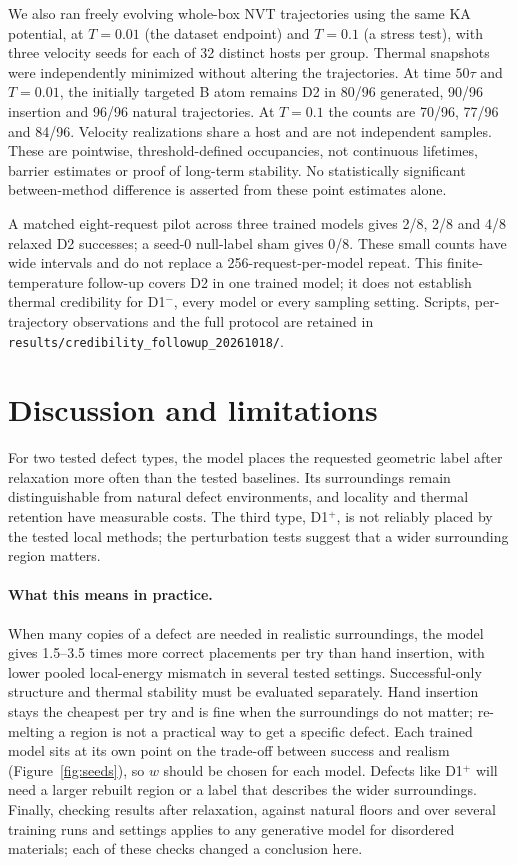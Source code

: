 \documentclass[10pt]{article}
\newcommand{\Dp}{D1$^{+}$}
\begin{document}
We also ran freely evolving whole-box NVT trajectories using the same KA potential, at $T=0.01$ (the dataset endpoint) and $T=0.1$ (a stress test), with three velocity seeds for each of 32 distinct hosts per group. Thermal snapshots were independently minimized without altering the trajectories. At time $50\tau$ and $T=0.01$, the initially targeted B atom remains D2 in 80/96 generated, 90/96 insertion and 96/96 natural trajectories. At $T=0.1$ the counts are 70/96, 77/96 and 84/96. Velocity realizations share a host and are not independent samples. These are pointwise, threshold-defined occupancies, not continuous lifetimes, barrier estimates or proof of long-term stability. No statistically significant between-method difference is asserted from these point estimates alone.

A matched eight-request pilot across three trained models gives 2/8, 2/8 and 4/8 relaxed D2 successes; a seed-0 null-label sham gives 0/8. These small counts have wide intervals and do not replace a 256-request-per-model repeat. This finite-temperature follow-up covers D2 in one trained model; it does not establish thermal credibility for D1$^{-}$, every model or every sampling setting. Scripts, per-trajectory observations and the full protocol are retained in \texttt{results/credibility\_followup\_20261018/}.

\section{Discussion and limitations}

For two tested defect types, the model places the requested geometric label after relaxation more often than the tested baselines. Its surroundings remain distinguishable from natural defect environments, and locality and thermal retention have measurable costs. The third type, \Dp{}, is not reliably placed by the tested local methods; the perturbation tests suggest that a wider surrounding region matters.

\paragraph{What this means in practice.} When many copies of a defect are needed in realistic surroundings, the model gives 1.5--3.5 times more correct placements per try than hand insertion, with lower pooled local-energy mismatch in several tested settings. Successful-only structure and thermal stability must be evaluated separately. Hand insertion stays the cheapest per try and is fine when the surroundings do not matter; re-melting a region is not a practical way to get a specific defect. Each trained model sits at its own point on the trade-off between success and realism (Figure~\ref{fig:seeds}), so $w$ should be chosen for each model. Defects like \Dp{} will need a larger rebuilt region or a label that describes the wider surroundings. Finally, checking results after relaxation, against natural floors and over several training runs and settings applies to any generative model for disordered materials; each of these checks changed a conclusion here.
\end{document}
